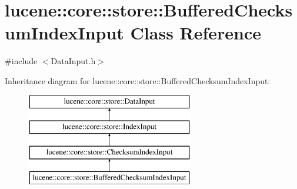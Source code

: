 \hypertarget{classlucene_1_1core_1_1store_1_1BufferedChecksumIndexInput}{}\section{lucene\+:\+:core\+:\+:store\+:\+:Buffered\+Checksum\+Index\+Input Class Reference}
\label{classlucene_1_1core_1_1store_1_1BufferedChecksumIndexInput}


{\ttfamily \#include $<$Data\+Input.\+h$>$}

Inheritance diagram for lucene\+:\+:core\+:\+:store\+:\+:Buffered\+Checksum\+Index\+Input\+:\begin{figure}[H]
\begin{center}
\leavevmode
\includegraphics[height=4.000000cm]{classlucene_1_1core_1_1store_1_1BufferedChecksumIndexInput}
\end{center}
\end{figure}
